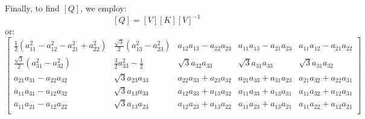 \documentclass[preprint,3p,times,sort&compress,letterpaper,12pt]{elsarticle} %
\begin{document}
Finally, to find $\left[Q\right]$, we employ:
\begin{equation}
    \left[Q\right] = \left[V\right] \left[K\right] \left[V\right]^{-1}
\end{equation}
or:
\footnotesize
\begin{equation}
    \begin{bmatrix}
        \frac{1}{2}\left(a_{11}^2-a_{12}^2-a_{21}^2+a_{22}^2\right) & \frac{\sqrt{3}}{2}\left(a_{13}^2-a_{23}^2\right) & a_{12}a_{13}-a_{22}a_{23} & a_{11}a_{13}-a_{21}a_{23} & a_{11}a_{12}-a_{21}a_{22} \\
        
        \frac{\sqrt{3}}{2}\left(a_{31}^2-a_{32}^2\right) & \frac{3}{2}a_{33}^2-\frac{1}{2} & \sqrt{3}a_{32}a_{33} & \sqrt{3}a_{31}a_{33} & \sqrt{3}a_{31}a_{32} \\

        a_{21}a_{31}-a_{22}a_{32} & \sqrt{3}a_{23}a_{33} & a_{22}a_{33}+a_{23}a_{32} & a_{21}a_{33}+a_{31}a_{23} & a_{21}a_{32}+a_{22}a_{31} \\
        
        a_{11}a_{31}-a_{12}a_{32} & \sqrt{3}a_{13}a_{33} & a_{12}a_{33}+a_{13}a_{32} & a_{11}a_{33}+a_{13}a_{31} & a_{11}a_{32}+a_{12}a_{31} \\
        
        a_{11}a_{21}-a_{12}a_{22} & \sqrt{3}a_{13}a_{23} & a_{12}a_{23}+a_{13}a_{22} & a_{11}a_{23}+a_{13}a_{21} & a_{11}a_{22}+a_{12}a_{21} \\
        
    \end{bmatrix}
\end{equation}
\normalsize
\end{document}
